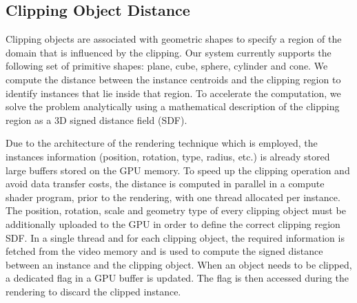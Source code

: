\subsection{Clipping Object Distance}
\label{localization}
Clipping objects are associated with geometric shapes to specify a region of the domain that is influenced by the clipping.
Our system currently supports the following set of primitive shapes: plane, cube, sphere, cylinder and cone.
We compute the distance between the instance centroids and the clipping region to identify instances that lie inside that region.
To accelerate the computation, we solve the problem analytically using a mathematical description of the clipping region as a 3D signed distance field (SDF).

Due to the architecture of the rendering technique which is employed, the instances information (position, rotation, type, radius, etc.) is already stored large buffers stored on the GPU memory.
To speed up the clipping operation and avoid data transfer costs, the distance is computed in parallel in a compute shader program, prior to the rendering, with one thread allocated per instance.  
The position, rotation, scale and geometry type of every clipping object must be additionally uploaded to the GPU in order to define the correct clipping region SDF.
In a single thread and for each clipping object, the required information is fetched from the video memory and is used to compute the signed distance between an instance and the clipping object.
When an object needs to be clipped, a dedicated flag in a GPU buffer is updated. The flag is then accessed during the rendering to discard the clipped instance.


